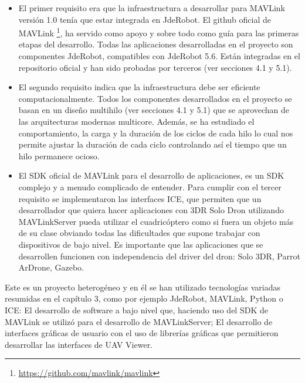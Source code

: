 \begin{itemize}
\item El primer requisito era que la infraestructura a desarrollar para MAVLink versión 1.0 tenía que estar integrada en JdeRobot. El github oficial de MAVLink \footnote{\url{https://github.com/mavlink/mavlink}}, ha servido como apoyo y sobre todo como guía para las primeras etapas del desarrollo. Todas las aplicaciones desarrolladas en el proyecto son componentes JdeRobot, compatibles con JdeRobot 5.6. Están integradas en el repositorio oficial y han sido probadas por terceros (ver secciones 4.1 y 5.1).
\item El segundo requisito indica que la infraestructura debe ser eficiente computacionalmente. Todos los componentes desarrollados en el proyecto se basan en un diseño multihilo (ver secciones 4.1 y 5.1) que se aprovechan de las arquitecturas modernas multicore. Además, se ha estudiado el comportamiento, la carga y la duración de los ciclos de cada hilo lo cual nos permite ajustar la duración de cada ciclo controlando así el tiempo que un hilo permanece ocioso.
\item El SDK oficial de MAVLink para el desarrollo de aplicaciones, es un SDK complejo y a menudo complicado de entender. Para cumplir con el tercer requisito se implementaron las interfaces ICE, que permiten que un desarrollador que quiera hacer aplicaciones con 3DR Solo Dron utilizando MAVLinkServer pueda utilizar el cuadricóptero como si fuera un objeto más de su clase obviando todas las dificultades que supone trabajar con dispositivos de bajo nivel. Es importante que las aplicaciones que se desarrollen funcionen con independencia del driver del dron: Solo 3DR, Parrot ArDrone, Gazebo.

\end{itemize}

Este es un proyecto heterogéneo y en él se han utilizado tecnologías variadas resumidas en el capítulo 3, como por ejemplo JdeRobot, MAVLink, Python o ICE: El desarrollo de software a bajo nivel que, haciendo uso del SDK de MAVLink se utilizó para el desarrollo de MAVLinkServer; El desarrollo de interfaces gráficas de usuario con el uso de librerías gráficas que permitieron desarrollar las interfaces de UAV Viewer.

